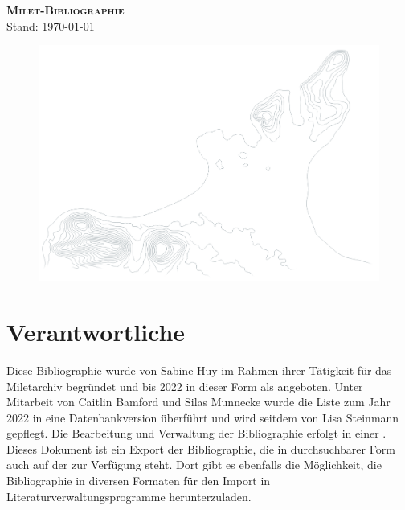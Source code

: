 
\begin{titlepage}
    \vspace*{3cm}
\begin{center}
    {\LARGE \textsc{\textbf{Milet-Bibliographie}}}\\
    
    Stand: \today
\end{center}
\vspace*{3cm}
\begin{figure}[h]
    \includegraphics[width=\textwidth]{Abb/Gelaende2.png}
\end{figure}

\end{titlepage}

\thispagestyle{empty}
\section*{Verantwortliche}

Diese Bibliographie wurde von Sabine Huy im Rahmen ihrer Tätigkeit für das Miletarchiv begründet und bis 2022 in dieser Form als  angeboten. Unter Mitarbeit von Caitlin Bamford und Silas Munnecke wurde die Liste zum Jahr 2022 in eine Datenbankversion überführt und wird seitdem von Lisa Steinmann gepflegt. Die Bearbeitung und Verwaltung der Bibliographie erfolgt in einer . Dieses Dokument ist ein Export der Bibliographie, die in durchsuchbarer Form auch auf der  zur Verfügung steht. Dort gibt es ebenfalls die Möglichkeit, die Bibliographie in diversen Formaten für den Import in Literaturverwaltungsprogramme herunterzuladen.\\

